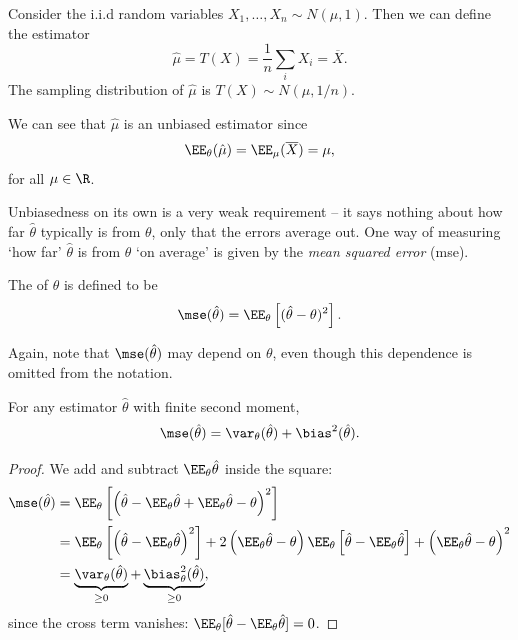 \begin{example}
  Consider the i.i.d random variables $X_1, \dots, X_n \sim N(\mu, 1)$. Then we can define the estimator
  $$
  \hat{\mu} = T(X) = \frac{1}{n}\sum_{i} X_i = \overline{X}.
  $$
  The sampling distribution of $\hat{\mu}$ is $T(X) \sim N(\mu, 1/n)$.

  We can see that $\hat{\mu}$ is an unbiased estimator since
  $$
  \EE_\theta(\hat{\mu}) = \EE_{\mu}(\overline{X}) = \mu,
  $$
  for all $\mu \in \R$.
\end{example}

Unbiasedness on its own is a very weak requirement -- it says nothing about how far $\hat\theta$ typically is from $\theta$, only that the errors average out. One way of measuring `how far' $\hat{\theta}$ is from $\theta$ `on average' is given by the \emph{mean squared error} (mse).

\begin{definition}
The  of $\hat\theta$ is defined to be
$$
\mse(\hat{\theta}) = \EE_{\theta}\left[(\hat{\theta} - \theta)^2\right].
$$
\end{definition}

Again, note that $\mse(\hat{\theta})$ may depend on $\theta$, even though this dependence is omitted from the notation.

\begin{proposition}
  For any estimator $\hat\theta$ with finite second moment,
  $$
  \mse(\hat\theta) = \var_\theta(\hat\theta) + \bias^2(\hat\theta).
  $$
\end{proposition}
\begin{proof}
  We add and subtract $\EE_\theta\hat\theta$ inside the square:
  \begin{align*}
      \mse(\hat{\theta}) &= \EE_{\theta}\left[\left(\hat{\theta}- \EE_\theta\hat\theta + \EE_{\theta} \hat{\theta}-\theta\right)^{2}\right] \\
      &= \EE_\theta\left[\left(\hat\theta - \EE_\theta \hat\theta\right)^2\right] + 2\left(\EE_\theta\hat\theta - \theta\right)\EE_\theta\left[\hat\theta - \EE_\theta\hat\theta\right] + \left(\EE_\theta\hat\theta - \theta\right)^2\\
      &=\underbrace{\var_\theta(\hat{\theta})}_{\geq 0}+\underbrace{\bias_\theta^{2}(\hat{\theta})}_{\geq 0},
  \end{align*}
  since the cross term vanishes: $\EE_\theta[\hat\theta - \EE_\theta\hat\theta] = 0$.
\end{proof}

